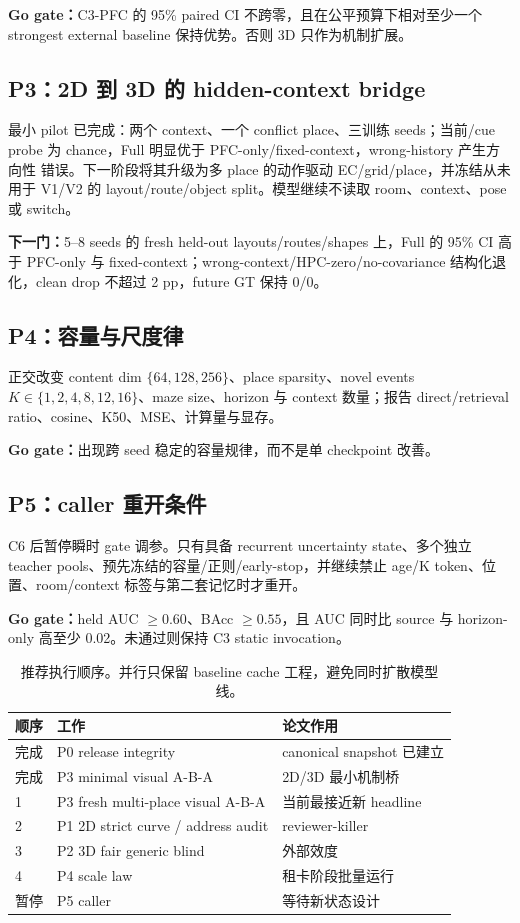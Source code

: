 \documentclass{article}
\begin{document}
\textbf{Go gate：}C3-PFC 的 95\% paired CI 不跨零，且在公平预算下相对至少一个 strongest external baseline 保持优势。否则 3D 只作为机制扩展。

\subsection{P3：2D 到 3D 的 hidden-context bridge}

最小 pilot 已完成：两个 context、一个 conflict place、三训练 seeds；当前/cue
probe 为 chance，Full 明显优于 PFC-only/fixed-context，wrong-history 产生方向性
错误。下一阶段将其升级为多 place 的动作驱动 EC/grid/place，并冻结从未用于
V1/V2 的 layout/route/object split。模型继续不读取 room、context、pose 或 switch。

\textbf{下一门：}5--8 seeds 的 fresh held-out layouts/routes/shapes 上，Full 的
95\% CI 高于 PFC-only 与 fixed-context；wrong-context/HPC-zero/no-covariance
结构化退化，clean drop 不超过 2 pp，future GT 保持 0/0。

\subsection{P4：容量与尺度律}

正交改变 content dim $\{64,128,256\}$、place sparsity、novel events $K\in\{1,2,4,8,12,16\}$、maze size、horizon 与 context 数量；报告 direct/retrieval ratio、cosine、K50、MSE、计算量与显存。

\textbf{Go gate：}出现跨 seed 稳定的容量规律，而不是单 checkpoint 改善。

\subsection{P5：caller 重开条件}

C6 后暂停瞬时 gate 调参。只有具备 recurrent uncertainty state、多个独立 teacher pools、预先冻结的容量/正则/early-stop，并继续禁止 age/K token、位置、room/context 标签与第二套记忆时才重开。

\textbf{Go gate：}held AUC $\geq0.60$、BAcc $\geq0.55$，且 AUC 同时比 source 与 horizon-only 高至少 0.02。未通过则保持 C3 static invocation。

\begin{table}[H]
\centering
\small
\caption{推荐执行顺序。并行只保留 baseline cache 工程，避免同时扩散模型线。}
\begin{tabularx}{\textwidth}{p{}Yp{0.20\textwidth}}
\toprule
顺序 & 工作 & 论文作用\\
\midrule
完成 & P0 release integrity & canonical snapshot 已建立\\
完成 & P3 minimal visual A-B-A & 2D/3D 最小机制桥\\
1 & P3 fresh multi-place visual A-B-A & 当前最接近新 headline\\
2 & P1 2D strict curve / address audit & reviewer-killer\\
3 & P2 3D fair generic blind & 外部效度\\
4 & P4 scale law & 租卡阶段批量运行\\
暂停 & P5 caller & 等待新状态设计\\
\bottomrule
\end{tabularx}
\end{table}
\end{document}
